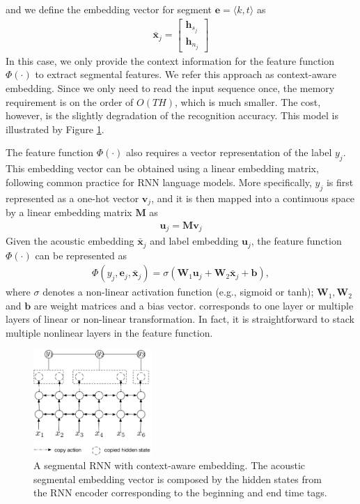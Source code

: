 \documentclass[a4paper]{article}
\begin{document}
and we define the embedding vector for segment ${\bm e} = \langle k, t\rangle$ as
\begin{align}
\bar{\bm x}_j =
\left [ \begin{array}{c}
{\bm h}_{s_j}  \\
{\bm h}_{n_j}   
\end{array} \right]
\end{align}
In this case, we only provide the context information for the feature function $\Phi(\cdot)$ to extract segmental features. We refer this approach as context-aware embedding. Since we only need to read the input sequence once, the memory requirement is on the order of $O(TH)$, which is much smaller. The cost, however, is the slightly degradation of the recognition accuracy. This model is illustrated by Figure \ref{fig:srnn}.
 
The feature function $\Phi(\cdot)$ also requires a vector representation of the label $y_j$. This embedding vector can be obtained using a linear embedding matrix, following common practice for RNN language models. More specifically, $y_j$ is first represented as a one-hot vector ${\bm v}_j$, and it is then mapped into a continuous space by a linear embedding matrix ${\bm M}$ as
\begin{eqnarray}
{\bm u}_j = {\bm M \bm v}_j
\end{eqnarray}
Given the acoustic embedding $\bar{\bm x}_j$ and label embedding $\bm u_j$, the feature function $\Phi(\cdot)$ can be represented as 
\begin{align}
\Phi(y_j, {\bm e}_j, \bar{\bm x}_j) = \sigma({\bm W}_1{\bm u}_j + {\bm W}_2\bar{\bm x}_j + \bm b),
\end{align}
where $\sigma$ denotes a non-linear activation function (e.g., sigmoid or tanh); $\bm W_1, \bm W_2$ and $\bm b$ are weight matrices and a bias vector. corresponds to one layer or multiple layers of linear or non-linear transformation. In fact, it is straightforward to stack multiple nonlinear layers in the feature function.

\begin{figure}[t]
\small
\centerline{\includegraphics[width=0.4\textwidth]{srnn}} \vskip -2mm
\caption{A segmental RNN with context-aware embedding. The acoustic segmental embedding vector is composed by the hidden states from the RNN encoder corresponding to the beginning and end time tags. }  
\label{fig:srnn}
\vskip -4mm
\end{figure}
\end{document}
